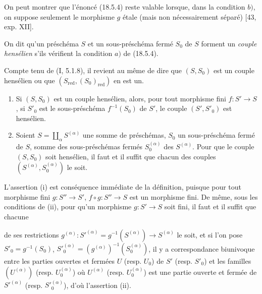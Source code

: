 \begin{remark}[18.5.4.4]
\label{IV.18.5.4.4}
On peut montrer que l'énoncé (18.5.4) reste valable lorsque, dans la condition $b)$, on suppose seulement le morphisme $g$ étale (mais non nécessairement séparé) [43, exp. XII].
\end{remark}

\begin{definition}[18.5.5]
On dit qu'un préschéma $S$ et un sous-préschéma fermé $S_0$ de $S$ forment un \emph{couple hensélien} s'ils vérifient la condition $a)$ de (18.5.4).
\end{definition}

Compte tenu de (I, 5.1.8), il revient au même de dire que $(S,S_0)$ est un couple hensélien ou que $(S_{\mathrm{red}},(S_0)_{\mathrm{red}})$ en est un.

\begin{proposition}[18.5.6]
\label{IV.18.5.6}
\begin{enumerate}
  \item[(i)] Si $(S,S_0)$ est un couple hensélien, alors, pour tout morphisme fini $f:S'\to S$, si $S'_0$ est le sous-préschéma $f^{-1}(S_0)$ de $S'$, le couple $(S',S'_0)$ est hensélien.
  \item[(ii)] Soient $S=\coprod_\alpha S^{(\alpha)}$ une somme de préschémas, $S_0$ un sous-préschéma fermé de $S$, somme des sous-préschémas fermés $S_0^{(\alpha)}$ des $S^{(\alpha)}$. Pour que le couple $(S,S_0)$ soit hensélien, il faut et il suffit que chacun des couples $(S^{(\alpha)},S_0^{(\alpha)})$ le soit.
\end{enumerate}
\end{proposition}

L'assertion (i) est conséquence immédiate de la définition, puisque pour tout morphisme fini $g:S''\to S'$, $f\circ g:S''\to S$ est un morphisme fini. De même, sous les conditions de (ii), pour qu'un morphisme $g:S'\to S$ soit fini, il faut et il suffit que chacune


de ses restrictions $g^{(\alpha)}:S'^{(\alpha)}=g^{-1}(S^{(\alpha)})\to S^{(\alpha)}$ le soit, et si l'on pose $S'_0=g^{-1}(S_0)$, $S'^{(\alpha)}_0=(g^{(\alpha)})^{-1}(S^{(\alpha)}_0)$, il y a correspondance biunivoque entre les parties ouvertes et fermées $U$ (resp. $U_0$) de $S'$ (resp. $S'_0$) et les familles $(U^{(\alpha)})$ (resp. $U^{(\alpha)}_0$) où $U^{(\alpha)}$ (resp. $U^{(\alpha)}_0$) est une partie ouverte et fermée de $S'^{(\alpha)}$ (resp. $S'^{(\alpha)}_0$), d'où l'assertion (ii).

